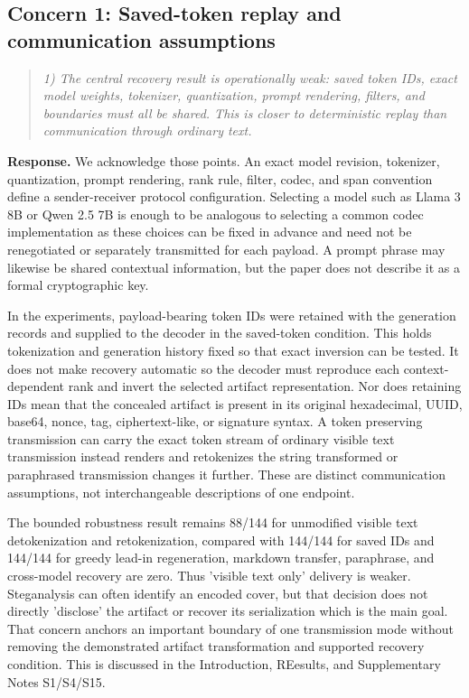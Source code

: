 \documentclass[11pt]{article}
\newenvironment{reviewcomment}{\begin{quote}\color{commentgray}\itshape}{\end{quote}}
\begin{document}
\subsection*{Concern 1: Saved-token replay and communication assumptions}

\begin{reviewcomment}
1) The central recovery result is operationally weak: saved token IDs, exact model weights, tokenizer, quantization, prompt rendering, filters, and boundaries must all be shared. This is closer to deterministic replay than communication through ordinary text.
\end{reviewcomment}

\noindent\textbf{Response.}
We acknowledge those points. An exact model revision, tokenizer, quantization, prompt rendering, rank rule, filter, codec, and span convention define a sender-receiver protocol configuration. Selecting a model such as Llama 3 8B or Qwen 2.5 7B is enough to be analogous to selecting a common codec implementation as these choices can be fixed in advance and need not be renegotiated or separately transmitted for each payload. A prompt phrase may likewise be shared contextual information, but the paper does not describe it as a formal cryptographic key.

In the experiments, payload-bearing token IDs were retained with the generation records and supplied to the decoder in the saved-token condition. This holds tokenization and generation history fixed so that exact inversion can be tested. It does not make recovery automatic so the decoder must reproduce each context-dependent rank and invert the selected artifact representation. Nor does retaining IDs mean that the concealed artifact is present in its original hexadecimal, UUID, base64, nonce, tag, ciphertext-like, or signature syntax. A token preserving transmission can carry the exact token stream of ordinary visible text transmission instead renders and retokenizes the string transformed or paraphrased transmission changes it further. These are distinct communication assumptions, not interchangeable descriptions of one endpoint.

The bounded robustness result remains 88/144 for unmodified visible text detokenization and retokenization, compared with 144/144 for saved IDs and 144/144 for greedy lead-in regeneration, markdown transfer, paraphrase, and cross-model recovery are zero. Thus 'visible text only' delivery is weaker. Steganalysis can often identify an encoded cover, but that decision does not directly 'disclose' the artifact or recover its serialization which is the main goal. That concern anchors an important boundary of one transmission mode without removing the demonstrated artifact transformation and supported recovery condition.
This is discussed in the Introduction, REesults, and Supplementary Notes S1/S4/S15.
\end{document}
